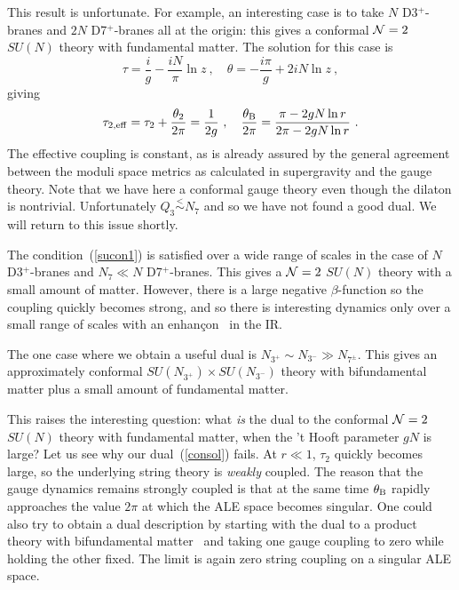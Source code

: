 \documentclass[a4paper,12pt]{article}
\renewcommand{\=}[1]{\bar{#1}}
\begin{document}
This result is unfortunate.  For example, an interesting case is to take $N$
D3$^+$-branes and $2N$ D7$^+$-branes all at the origin: this gives a conformal
${\cal N}=2$ $SU(N)$ theory with fundamental matter.  The solution for this case is
\begin{equation}
\tau = \frac{i}{g} - \frac{iN}{\pi} \ln z\ , \quad
\theta = -\frac{i\pi}{g} + 2iN\ln z\ , \label{consol}
\end{equation}
giving
\begin{equation}
\tau_{2,\rm eff} = \tau_2 + \frac{\theta_2}{2\pi} = \frac{1}{2g}\ , \quad
\frac{\theta_{\rm B}}{2\pi} = \frac{\pi - 2gN \ln r}{2\pi - 2gN \ln r}\ .
\end{equation}
The effective coupling is constant, as is already assured by the general
agreement between the moduli space metrics as calculated in supergravity and the
gauge theory.  Note that we have here a conformal gauge theory even
though the dilaton is nontrivial.  Unfortunately $Q_3 \stackrel{<}{\sim} N_7$
and so we have not found a good dual.  We will return to this issue shortly.

The condition~(\ref{sucon1}) is satisfied over a wide range of scales in the
case of
$N$ D3$^+$-branes and $N_7 \ll N$ D7$^+$-branes.  This gives a ${\cal N}=2$ $SU(N)$
theory with a small amount of matter.  However, there is a large negative
$\beta$-function so the coupling quickly becomes strong, and so there is
interesting dynamics only over a small range of scales with an
enhan\c con~\cite{enhan} in the IR.

The one case where we obtain a useful dual is $N_{3^+} \sim N_{3^-} \gg N_{7^\pm}$.
This gives an approximately conformal $SU(N_{3^+}) \times SU(N_{3^-})$ theory with
bifundamental matter plus a small amount of fundamental matter.

This raises the interesting question: what {\it is} the dual to the conformal
${\cal N}=2$ $SU(N)$ theory with fundamental matter, when the 't Hooft parameter
$gN$ is large?  Let us see why our dual~(\ref{consol}) fails.  At $r \ll 1$,
$\tau_2$ quickly becomes large, so the underlying string theory is {\it weakly}
coupled. The reason that the gauge dynamics remains strongly coupled is that at
the same time $\theta_{\rm B}$ rapidly approaches the value $2\pi$ at which the
ALE space becomes singular.  One could also try to obtain a dual description
by starting with the dual to a product theory with bifundamental
matter~\cite{GK-KN} and taking one gauge coupling to zero while holding the
other fixed.  The limit is again zero string coupling on a singular
ALE space.
\end{document}
